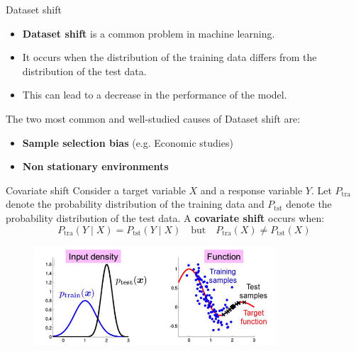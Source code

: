 \documentclass[11pt]{beamer}
\begin{document}
\begin{frame}{Dataset shift}
	\begin{itemize}
		\item \textbf{Dataset shift} is a common problem in machine learning.
		
		\item It occurs when the distribution of the training data differs from the distribution of the test data.
		
		\item This can lead to a decrease in the performance of the model.
	\end{itemize}
	The two most common and well-studied causes of Dataset shift are:
	\begin{itemize}
		\item \textbf{Sample selection bias} (e.g. Economic studies) %
		
		\item \textbf{Non stationary environments}%
	\end{itemize}
\end{frame} 


\begin{frame}{Covariate shift}
	Consider a target variable \( X \) and a response variable \( Y \). Let \( P_{\text{tra}} \) denote the probability distribution of the training data and \( P_{\text{tst}} \) denote the probability distribution of the test data. A \textbf{covariate shift} occurs when:  
	\vspace{0.3cm}
	\[	P_{\text{tra}}(Y \mid X) = P_{\text{tst}}(Y \mid X) \quad \text{but} \quad P_{\text{tra}}(X) \neq P_{\text{tst}}(X)	\]
	
	\begin{figure}[H]
		\centering
		\includegraphics[width=9cm]{../assets/immagine.png}
		\label{fig:immagine}
	\end{figure}
\end{frame}
\end{document}
